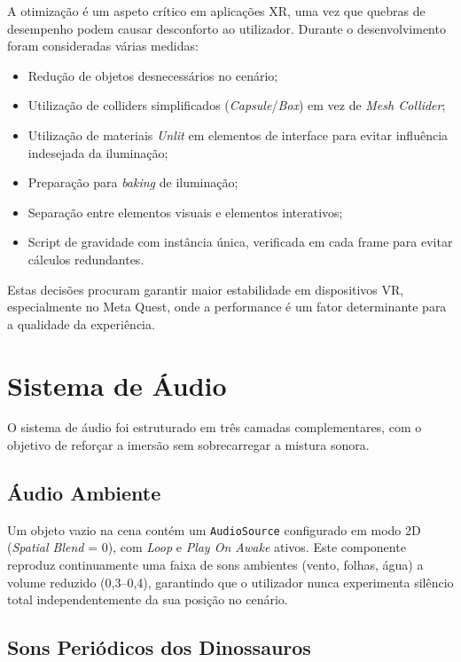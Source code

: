 \documentclass[a4paper,11pt]{report}
\newcommand{\code}[1]{\texttt{#1}}
\begin{document}
A otimização é um aspeto crítico em aplicações XR, uma vez que quebras de
desempenho podem causar desconforto ao utilizador. Durante o desenvolvimento
foram consideradas várias medidas:

\begin{itemize}
    \setlength\itemsep{0pt}
    \item Redução de objetos desnecessários no cenário;
    \item Utilização de colliders simplificados (\textit{Capsule}/\textit{Box})
          em vez de \textit{Mesh Collider};
    \item Utilização de materiais \textit{Unlit} em elementos de interface
          para evitar influência indesejada da iluminação;
    \item Preparação para \textit{baking} de iluminação;
    \item Separação entre elementos visuais e elementos interativos;
    \item Script de gravidade com instância única, verificada em cada frame
          para evitar cálculos redundantes.
\end{itemize}

Estas decisões procuram garantir maior estabilidade em dispositivos VR,
especialmente no Meta Quest, onde a performance é um fator determinante para
a qualidade da experiência.

\section{Sistema de Áudio}
\label{sec:audio}

O sistema de áudio foi estruturado em três camadas complementares, com o
objetivo de reforçar a imersão sem sobrecarregar a mistura sonora.

\subsection{Áudio Ambiente}

Um objeto vazio na cena contém um \code{AudioSource} configurado em modo 2D
(\textit{Spatial Blend} = 0), com \textit{Loop} e \textit{Play On Awake} ativos.
Este componente reproduz continuamente uma faixa de sons ambientes (vento, folhas,
água) a volume reduzido (0{,}3--0{,}4), garantindo que o utilizador nunca
experimenta silêncio total independentemente da sua posição no cenário.

\subsection{Sons Periódicos dos Dinossauros}
\end{document}
